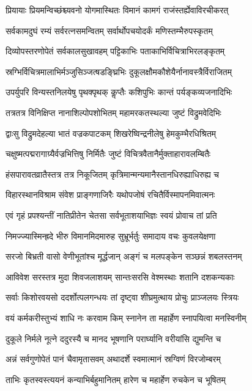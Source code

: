 \twolineshloka
{प्रियायाः प्रियमन्विच्छंश्च्यवनो योगमास्थितः}
{विमानं कामगं राजंस्तर्ह्येवाविरचीकरत्}%

\twolineshloka
{सर्वकामदुघं रम्यं सर्वरत्नसमन्वितम्}
{सर्वार्थोपचयोदर्कं मणिस्तम्भैरुपस्कृतम्}%

\twolineshloka
{दिव्योपस्तरणोपेतं सर्वकालसुखावहम्}
{पट्टिकाभिः पताकाभिर्विचित्राभिरलङ्कृतम्}%

\twolineshloka
{स्रग्भिर्विचित्रमालाभिर्मञ्जुसिञ्जत्षडङ्घ्रिभिः}
{दुकूलक्षौमकौशेयैर्नानावस्त्रैर्विराजितम्}%

\twolineshloka
{उपर्युपरि विन्यस्तनिलयेषु पृथक्पृथक्}
{कॢप्तैः कशिपुभिः कान्तं पर्यङ्कव्यजनादिभिः}%

\twolineshloka
{तत्रतत्र विनिक्षिप्त नानाशिल्पोपशोभितम्}
{महामरकतस्थल्या जुष्टं विद्रुमवेदिभिः}%

\twolineshloka
{द्वाःसु विद्रुमदेहल्या भातं वज्रकपाटकम्}
{शिखरेष्विन्द्रनीलेषु हेमकुम्भैरधिश्रितम्}%

\twolineshloka
{चक्षुष्मत्पद्मरागाग्र्यैर्वज्रभित्तिषु निर्मितैः}
{जुष्टं विचित्रवैतानैर्मुक्ताहारावलम्बितैः}%

\twolineshloka
{हंसपारावतव्रातैस्तत्र तत्र निकूजितम्}
{कृत्रिमान्मन्यमानैस्तानधिरुह्याधिरुह्य च}%

\twolineshloka
{विहारस्थानविश्राम संवेश प्राङ्गणाजिरैः}
{यथोपजोषं रचितैर्विस्मापनमिवात्मनः}%

\twolineshloka
{एवं गृहं प्रपश्यन्तीं नातिप्रीतेन चेतसा}
{सर्वभूताशयाभिज्ञः स्वयं प्रोवाच तां प्रति}%

\twolineshloka
{निमज्ज्यास्मिन्ह्रदे भीरु विमानमिदमारुह}
{सुभ्रूर्भर्तुः समादाय वचः कुवलयेक्षणा}%

\twolineshloka
{सरजो बिभ्रती वासो वेणीभूतांश्च मूर्द्धजान्}
{अङ्गं च मलपङ्केन सञ्छन्नं शबलस्तनम्}%

\twolineshloka
{आविवेश सरस्तत्र मुदा शिवजलाशयम्}
{सान्तःसरसि वेश्मस्थाः शतानि दशकन्यकाः}%

\twolineshloka
{सर्वाः किशोरवयसो ददर्शोत्पलगन्धयः}
{तां दृष्ट्वा शीघ्रमुत्थाय प्रोचुः प्राञ्जलयः स्त्रियः}%

\twolineshloka
{वयं कर्मकरीस्तुभ्यं शाधि नः करवाम किम्}
{स्नानेन ता महार्हेण स्नापयित्वा मनस्विनीम्}%

\twolineshloka
{दुकूले निर्मले नूत्ने ददुरस्यै च मानद}
{भूषणानि परार्घ्यानि वरीयांसि द्युमन्ति च}%

\twolineshloka
{अन्नं सर्वगुणोपेतं पानं चैवामृतासवम्}
{अथादर्शे स्वमात्मानं स्रग्विणं विरजोम्बरम्}%

\twolineshloka
{ताभिः कृतस्वस्त्ययनं कन्याभिर्बहुमानितम्}
{हारेण च महार्हेण रुचकेन च भूषितम्}%

